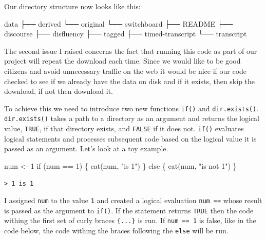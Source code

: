 \documentclass[
  letterpaper,
]{latex/krantz}
\newenvironment{Shaded}{\begin{snugshade}}{\end{snugshade}}
\newcommand{\ControlFlowTok}[1]{\textcolor[rgb]{0.00,0.00,0.00}{#1}}
\newcommand{\DecValTok}[1]{\textcolor[rgb]{0.00,0.00,0.00}{#1}}
\newcommand{\ExtensionTok}[1]{\textcolor[rgb]{0.00,0.00,0.00}{#1}}
\newcommand{\FunctionTok}[1]{\textcolor[rgb]{0.00,0.00,0.00}{#1}}
\newcommand{\NormalTok}[1]{\textcolor[rgb]{0.00,0.00,0.00}{#1}}
\newcommand{\OtherTok}[1]{\textcolor[rgb]{0.00,0.00,0.00}{#1}}
\newcommand{\SpecialCharTok}[1]{\textcolor[rgb]{0.00,0.00,0.00}{#1}}
\newcommand{\StringTok}[1]{\textcolor[rgb]{0.00,0.00,0.00}{#1}}
\begin{document}
Our directory structure now looks like this:

\begin{Shaded}
\begin{Highlighting}[]
\ExtensionTok{data}
\ExtensionTok{├──}\NormalTok{ derived}
\ExtensionTok{└──}\NormalTok{ original}
    \ExtensionTok{└──}\NormalTok{ switchboard}
        \ExtensionTok{├──}\NormalTok{ README}
        \ExtensionTok{├──}\NormalTok{ discourse}
        \ExtensionTok{├──}\NormalTok{ disfluency}
        \ExtensionTok{├──}\NormalTok{ tagged}
        \ExtensionTok{├──}\NormalTok{ timed{-}transcript}
        \ExtensionTok{└──}\NormalTok{ transcript}
\end{Highlighting}
\end{Shaded}

The second issue I raised concerns the fact that running this code as
part of our project will repeat the download each time. Since we would
like to be good citizens and avoid unnecessary traffic on the web it
would be nice if our code checked to see if we already have the data on
disk and if it exists, then skip the download, if not then download it.

To achieve this we need to introduce two new functions \texttt{if()} and
\texttt{dir.exists()}. \texttt{dir.exists()} takes a path to a directory
as an argument and returns the logical value, \texttt{TRUE}, if that
directory exists, and \texttt{FALSE} if it does not. \texttt{if()}
evaluates logical statements and processes subsequent code based on the
logical value it is passed as an argument. Let's look at a toy example.

\begin{Shaded}
\begin{Highlighting}[]
\NormalTok{num }\OtherTok{\textless{}{-}} \DecValTok{1}
\ControlFlowTok{if}\NormalTok{ (num }\SpecialCharTok{==} \DecValTok{1}\NormalTok{) \{}
  \FunctionTok{cat}\NormalTok{(num, }\StringTok{"is 1"}\NormalTok{)}
\NormalTok{\} }\ControlFlowTok{else}\NormalTok{ \{}
  \FunctionTok{cat}\NormalTok{(num, }\StringTok{"is not 1"}\NormalTok{)}
\NormalTok{\}}
\end{Highlighting}
\end{Shaded}

\begin{verbatim}
> 1 is 1
\end{verbatim}

I assigned \texttt{num} to the value \texttt{1} and created a logical
evaluation \texttt{num\ ==} whose result is passed as the argument to
\texttt{if()}. If the statement returns \texttt{TRUE} then the code
withing the first set of curly braces \texttt{\{...\}} is run. If
\texttt{num\ ==\ 1} is false, like in the code below, the code withing
the braces following the \texttt{else} will be run.
\end{document}
